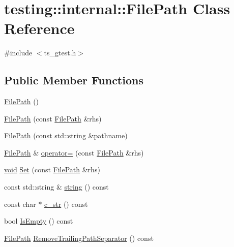 \hypertarget{classtesting_1_1internal_1_1FilePath}{\section{testing\-:\-:internal\-:\-:File\-Path Class Reference}
\label{classtesting_1_1internal_1_1FilePath}
}


{\ttfamily \#include $<$ts\-\_\-gtest.\-h$>$}

\subsection*{Public Member Functions}
\begin{DoxyCompactItemize}
\item 
\hyperlink{classtesting_1_1internal_1_1FilePath_a3504a51accbca78a52fe586133ea5499}{File\-Path} ()
\item 
\hyperlink{classtesting_1_1internal_1_1FilePath_ae9efd0fee56c6e3e2d659b464250b112}{File\-Path} (const \hyperlink{classtesting_1_1internal_1_1FilePath}{File\-Path} \&rhs)
\item 
\hyperlink{classtesting_1_1internal_1_1FilePath_a9fc072b140aa0652a7022fb809fe3abe}{File\-Path} (const std\-::string \&pathname)
\item 
\hyperlink{classtesting_1_1internal_1_1FilePath}{File\-Path} \& \hyperlink{classtesting_1_1internal_1_1FilePath_a8d9c1bafb90f10bcd5611a54d8f326ef}{operator=} (const \hyperlink{classtesting_1_1internal_1_1FilePath}{File\-Path} \&rhs)
\item 
\hyperlink{legacy_8hpp_a8bb47f092d473522721002c86c13b94e}{void} \hyperlink{classtesting_1_1internal_1_1FilePath_a15a42de7518e89254e0640dd9317d5f7}{Set} (const \hyperlink{classtesting_1_1internal_1_1FilePath}{File\-Path} \&rhs)
\item 
const std\-::string \& \hyperlink{classtesting_1_1internal_1_1FilePath_a7c544a30af67e2da5ce7e625f8402818}{string} () const 
\item 
const char $\ast$ \hyperlink{classtesting_1_1internal_1_1FilePath_a85297234dac0acd936632dff8634c2b9}{c\-\_\-str} () const 
\item 
bool \hyperlink{classtesting_1_1internal_1_1FilePath_a44543ff34ae757038ab20925659b447a}{Is\-Empty} () const 
\item 
\hyperlink{classtesting_1_1internal_1_1FilePath}{File\-Path} \hyperlink{classtesting_1_1internal_1_1FilePath_a952e1b2a9909cdeaf25de5fcdf069b3a}{Remove\-Trailing\-Path\-Separator} () const 

\end{DoxyCompactItemize}
